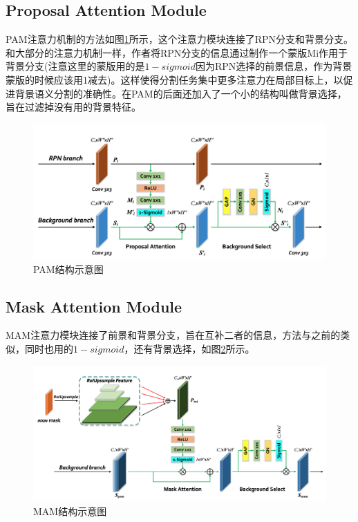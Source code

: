 \documentclass[cn]{elegantbook}
\begin{document}
\subsection{Proposal Attention Module}
PAM注意力机制的方法如图\ref{pam}所示，这个注意力模块连接了RPN分支和背景分支。和大部分的注意力机制一样，作者将RPN分支的信息通过制作一个蒙版Mi作用于背景分支(注意这里的蒙版用的是$1-sigmoid$因为RPN选择的前景信息，作为背景蒙版的时候应该用1减去)。这样使得分割任务集中更多注意力在局部目标上，以促进背景语义分割的准确性。在PAM的后面还加入了一个小的结构叫做背景选择，旨在过滤掉没有用的背景特征。
\begin{figure}[h]
	\centering
	\includegraphics[width=\textwidth]{images/pam}
	\caption{\label{pam}PAM结构示意图}
\end{figure}

\subsection{Mask Attention Module}
MAM注意力模块连接了前景和背景分支，旨在互补二者的信息，方法与之前的类似，同时也用的$1-sigmoid$，还有背景选择，如图\ref{mam}所示。

\begin{figure}[h]
	\centering
	\includegraphics[width=\textwidth]{images/mam}
	\caption{\label{mam}MAM结构示意图}
\end{figure}
\end{document}
